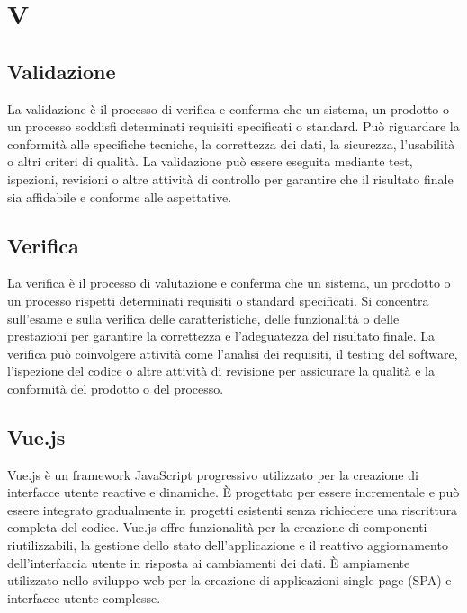 \section{V}

\vspace{2em}
\subsection*{Validazione}
La validazione è il processo di verifica e conferma che un sistema, un prodotto o un processo soddisfi determinati requisiti specificati o standard. Può riguardare la conformità alle specifiche tecniche, la correttezza dei dati, la sicurezza, l'usabilità o altri criteri di qualità. La validazione può essere eseguita mediante test, ispezioni, revisioni o altre attività di controllo per garantire che il risultato finale sia affidabile e conforme alle aspettative.

\vspace{2em}
\subsection*{Verifica}
La verifica è il processo di valutazione e conferma che un sistema, un prodotto o un processo rispetti determinati requisiti o standard specificati. Si concentra sull'esame e sulla verifica delle caratteristiche, delle funzionalità o delle prestazioni per garantire la correttezza e l'adeguatezza del risultato finale. La verifica può coinvolgere attività come l'analisi dei requisiti, il testing del software, l'ispezione del codice o altre attività di revisione per assicurare la qualità e la conformità del prodotto o del processo.

\vspace{2em}
\subsection*{Vue.js}
Vue.js è un framework JavaScript progressivo utilizzato per la creazione di interfacce utente reactive e dinamiche. È progettato per essere incrementale e può essere integrato gradualmente in progetti esistenti senza richiedere una riscrittura completa del codice. Vue.js offre funzionalità per la creazione di componenti riutilizzabili, la gestione dello stato dell'applicazione e il reattivo aggiornamento dell'interfaccia utente in risposta ai cambiamenti dei dati. È ampiamente utilizzato nello sviluppo web per la creazione di applicazioni single-page (SPA) e interfacce utente complesse.
